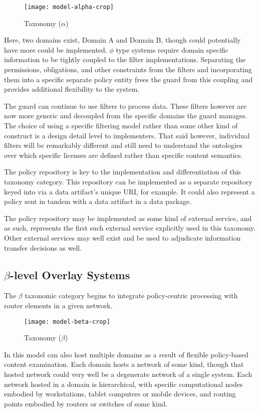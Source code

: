 \begin{figure}[!t]
\centering
\texttt{[image: model-alpha-crop]}
\caption{Taxonomy ($\alpha$)}
\label{fig:model:taxonomy-alpha}
\end{figure}

Here, two domains exist, Domain A and Domain B, though could potentially have more could be implemented.  $\phi$ type systems require domain specific information to be tightly coupled to the filter implementations.  Separating the permissions, obligations, and other constraints from the filters and incorporating them into a specific separate policy entity frees the guard from this coupling and provides additional flexibility to the system.

The guard can continue to use filters to process data.  These filters however are now more generic and decoupled from the specific domains the guard manages.  The choice of using a specific filtering model rather than some other kind of construct is a design detail level to implementers.  That said however, individual filters will be remarkably different and still need to understand the ontologies over which specific licenses are defined rather than specific content semantics.

The policy repository is key to the implementation and differentiation of this taxonomy category.  This repository can be implemented as a separate repository keyed into via a data artifact's unique URI, for example.  It could also represent a policy sent in tandem with a data artifact in a data package.

The policy repository may be implemented as some kind of external service, and as such, represents the first such external service explicitly used in this taxonomy.  Other external services may well exist and be used to adjudicate information transfer decisions as well.

\subsection{$\beta$-level Overlay Systems}
The $\beta$ taxonomic category begins to integrate policy-centric processing with router elements in a given network.

\begin{figure}[!t]
\centering
\texttt{[image: model-beta-crop]}
\caption{Taxonomy ($\beta$)}
\label{fig:model:taxonomy-beta}
\end{figure}

In this model can also host multiple domains as a result of flexible policy-based content examination.  Each domain hosts a network of some kind, though that hosted network could very well be a degenerate network of a single system.  Each network hosted in a domain is hierarchical, with specific computational nodes embodied by workstations, tablet computers or mobile devices, and routing points embodied by routers or switches of some kind.

